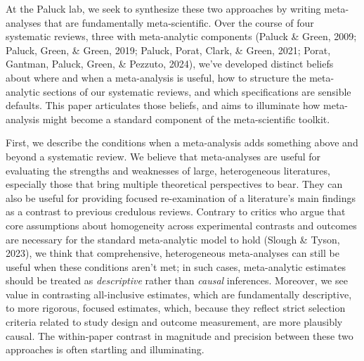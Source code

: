 \documentclass[
  man]{apa6}
\begin{document}
At the Paluck lab, we seek to synthesize these two approaches by writing meta-analyses that are fundamentally meta-scientific. Over the course of four systematic reviews, three with meta-analytic components (Paluck \& Green, 2009; Paluck, Green, \& Green, 2019; Paluck, Porat, Clark, \& Green, 2021; Porat, Gantman, Paluck, Green, \& Pezzuto, 2024), we've developed distinct beliefs about where and when a meta-analysis is useful, how to structure the meta-analytic sections of our systematic reviews, and which specifications are sensible defaults. This paper articulates those beliefs, and aims to illuminate how meta-analysis might become a standard component of the meta-scientific toolkit.

First, we describe the conditions when a meta-analysis adds something above and beyond a systematic review. We believe that meta-analyses are useful for evaluating the strengths and weaknesses of large, heterogeneous literatures, especially those that bring multiple theoretical perspectives to bear. They can also be useful for providing focused re-examination of a literature's main findings as a contrast to previous credulous reviews. Contrary to critics who argue that core assumptions about homogeneity across experimental contrasts and outcomes are necessary for the standard meta-analytic model to hold (Slough \& Tyson, 2023), we think that comprehensive, heterogeneous meta-analyses can still be useful when these conditions aren't met; in such cases, meta-analytic estimates should be treated as \emph{descriptive} rather than \emph{causal} inferences. Moreover, we see value in contrasting all-inclusive estimates, which are fundamentally descriptive, to more rigorous, focused estimates, which, because they reflect strict selection criteria related to study design and outcome measurement, are more plausibly causal. The within-paper contrast in magnitude and precision between these two approaches is often startling and illuminating.
\end{document}

